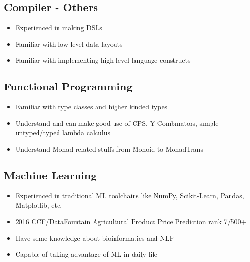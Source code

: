 \documentclass{resume}
\begin{document}
\subsection{\textbf{Compiler - Others}}
\begin{itemize}
  \item Experienced in making DSLs
  \item Familiar with low level data layouts
  \item Familiar with implementing high level language constructs
\end{itemize}

\subsection{\textbf{Functional Programming}}
\begin{itemize}
  \item Familiar with type classes and higher kinded types
  \item Understand and can make good use of CPS, Y-Combinators, simple untyped/typed lambda calculus
  \item Understand Monad related stuffs from Monoid to MonadTrans
\end{itemize}

\subsection{\textbf{Machine Learning}}
\begin{itemize}
  \item Experienced in traditional ML toolchains like NumPy, Scikit-Learn, Pandas, Matplotlib, etc.
  \item 2016 CCF/DataFountain Agricultural Product Price Prediction rank 7/500+
  \item Have some knowledge about bioinformatics and NLP
  \item Capable of taking advantage of ML in daily life
\end{itemize}
\end{document}

